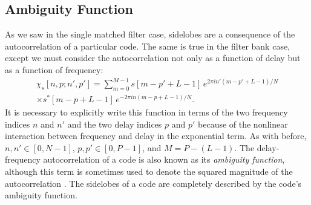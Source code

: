 \subsection{Ambiguity Function}
As we saw in the single matched filter case, sidelobes are a consequence of the autocorrelation of a particular code. The same is true in the filter bank case, except we must consider the autocorrelation not only as a function of delay but as a function of frequency:
\begin{multline}
 \chi_s[n,p;n',p'] = \sum_{m=0}^{M-1} s[m - p' + L - 1]\, e^{2\pi i n' (m-p'+L-1)/N}\\
 \times s^*[m - p + L - 1]\, e^{-2\pi i n (m-p+L-1)/N}.
\end{multline}
It is necessary to explicitly write this function in terms of the two frequency indices $n$ and $n'$ and the two delay indices $p$ and $p'$ because of the nonlinear interaction between frequency and delay in the exponential term. As with before, $n,n' \in [0, N-1]$, $p,p' \in [0, P-1]$, and $M = P - (L-1)$. The delay-frequency autocorrelation of a code is also known as its \emph{ambiguity function}, although this term is sometimes used to denote the squared magnitude of the autocorrelation \autocite{Woo80}. The sidelobes of a code are completely described by the code's ambiguity function.

